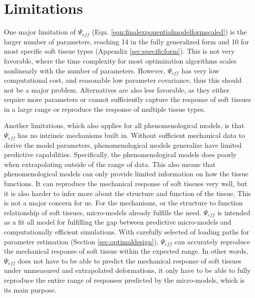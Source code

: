 

\section{Limitations} 
	
    One major limitation of $\Psi_{eff}$ (Eqn. \ref{eqn:finalexponentialmodelformscaled}) is the larger number of parameters, reaching 14 in the fully generalized form and 10 for most specific soft tissue types (Appendix \ref{sec:specificform}). This is not very favorable, where the time complexity for most optimization algorithms scales nonlinearly with the number of parameters. However, $\Psi_{eff}$ has very low computational cost, and reasonable low parameter covariance, thus this should not be a major problem. Alternatives are also less favorable, as they either require more parameters or cannot sufficiently capture the response of soft tissues in a large range or reproduce the response of multiple tissue types. 
    
    Another limitations, which also applies for all phenomenological models, is that $\Psi_{eff}$ has no intrinsic mechanisms built in. Without sufficient mechanical data to derive the model parameters, phenomenological models generalize have limited predictive capabilities. Specifically, the phenomenological models does poorly when extrapolating outside of the range of data. This also means that phenomenological models can only provide limited information on how the tissue functions. It can reproduce the mechanical response of soft tissues very well, but it is also harder to infer more about the structure and function of the tissue. This is not a major concern for us. For the mechanisms, or the structure to function relationship of soft tissues, micro-models already fulfills the need. $\Psi_{eff}$ is intended as a fit all model for fulfilling the gap between predictive micro-models and computationally efficient simulations. With carefully selected of loading paths for parameter estimation (Section \ref{sec:optimaldesign}), $\Psi_{eff}$ can accurately reproduce the mechanical response of soft tissue within the expected range. In other words, $\Psi_{eff}$ does not have to be able to predict the mechanical response of soft tissues under unmeasured and extrapolated deformations, it only have to be able to fully reproduce the entire range of responses predicted by the micro-models, which is its main purpose. 




